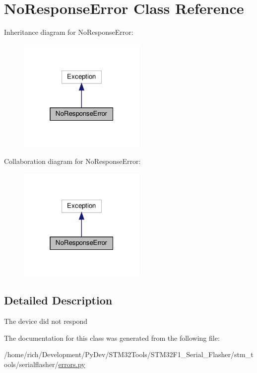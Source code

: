 \hypertarget{classstm__tools_1_1serialflasher_1_1errors_1_1NoResponseError}{}\section{No\+Response\+Error Class Reference}
\label{classstm__tools_1_1serialflasher_1_1errors_1_1NoResponseError}


Inheritance diagram for No\+Response\+Error\+:
\nopagebreak
\begin{figure}[H]
\begin{center}
\leavevmode
\includegraphics[width=175pt]{classstm__tools_1_1serialflasher_1_1errors_1_1NoResponseError__inherit__graph}
\end{center}
\end{figure}


Collaboration diagram for No\+Response\+Error\+:
\nopagebreak
\begin{figure}[H]
\begin{center}
\leavevmode
\includegraphics[width=175pt]{classstm__tools_1_1serialflasher_1_1errors_1_1NoResponseError__coll__graph}
\end{center}
\end{figure}


\subsection{Detailed Description}
\begin{DoxyVerb}The device did not respond\end{DoxyVerb}
 

The documentation for this class was generated from the following file\+:\begin{DoxyCompactItemize}
\item 
/home/rich/\+Development/\+Py\+Dev/\+S\+T\+M32\+Tools/\+S\+T\+M32\+F1\+\_\+\+Serial\+\_\+\+Flasher/stm\+\_\+tools/serialflasher/\hyperlink{errors_8py}{errors.\+py}\end{DoxyCompactItemize}
